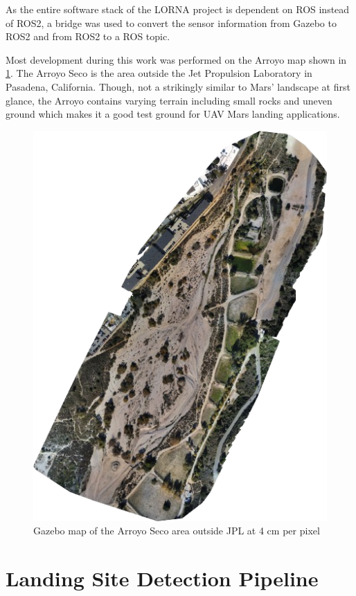 As the entire software stack of the LORNA project is dependent on ROS instead of ROS2, a bridge was used to convert the sensor information from Gazebo to ROS2 and from ROS2 to a ROS topic.

Most development during this work was performed on the Arroyo map shown in \cref{fig:arroyo_intro}. The Arroyo Seco is the area outside the Jet Propulsion Laboratory in Pasadena, California. Though, not a strikingly similar to Mars' landscape at first glance, the Arroyo contains varying terrain including small rocks and uneven ground which makes it a good test ground for UAV Mars landing applications.

\begin{figure}[ht!]
    \centering
    \includegraphics[scale=0.45]{images/evaluation/arroyo.png}
    \caption{Gazebo map of the Arroyo Seco area outside JPL at 4 cm per pixel}
    \label{fig:arroyo_intro}
\end{figure}


\section{Landing Site Detection Pipeline}\label{sec:setup:LSP}

